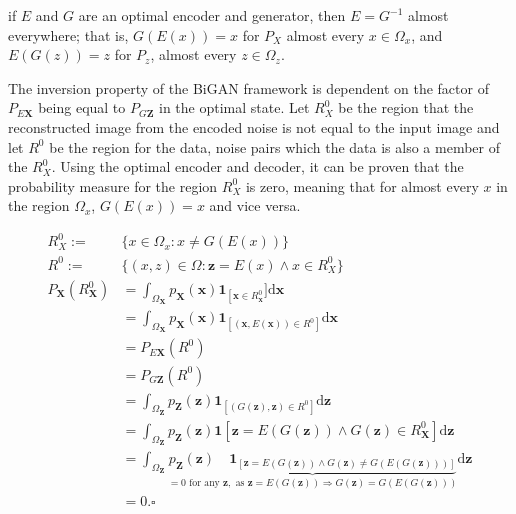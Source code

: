 \begin{theorem}
    \label{th:bigan_inv}
    if $E$ and $G$ are an optimal encoder and generator, then $E = G^{-1}$ almost everywhere; that is,
    $G(E(x)) = x$ for $P_X$ almost every $x \in \Omega_x$, and $E(G(z)) = z$ for $P_z$, almost every
    $z \in \Omega_z$. \cite{Donahue2017AdversarialFL}
\end{theorem}

The inversion property of the BiGAN framework is dependent on the factor of $P_{E\mathbf{X}}$ being
equal to $P_{G\mathbf{Z}}$ in the optimal state. Let $R_{X}^{0}$ be the region that the
reconstructed image from the encoded noise is not equal to the input image and let $R^{0}$ be the
region for the data, noise pairs which the data is also a member of the $R^{0}_{X}$. Using the
optimal encoder and decoder, it can be proven that the probability measure for the region
$R^{0}_{X}$ is zero, meaning that for almost every $x$ in the region $\Omega_x$, $G(E(x)) = x$ and
vice versa.


\begin{align}
    R^{0}_{X} :=& \{x \in \Omega_x : x \neq G(E(x))\} \\[5pt]
    R^{0} :=& \{(x,z) \in \Omega : \mathbf{z} = E(x) \land x \in R^{0}_{X}\}\\[5pt]
    P_{\mathbf{X}}\left(R_{\mathbf{X}}^{0}\right) &=\int_{\Omega_{\mathbf{X}}} p_{\mathbf{X}}(\mathbf{x}) \mathbf{1}_{\left[\mathbf{x} \in R_{\mathbf{x}}^{0}\right.} ] \mathrm{d} \mathbf{x} \\[5pt]
    &=\int_{\Omega_{\mathbf{X}}} p_{\mathbf{X}}(\mathbf{x}) \mathbf{1}_{\left[(\mathbf{x}, E(\mathbf{x})) \in R^{0}\right]} \mathrm{d} \mathbf{x} \\[5pt]
    & =P_{E \mathbf{X}}\left(R^{0}\right)\\[5pt]
    & =P_{G \mathbf{Z}}\left(R^{0}\right)\\[5pt]
    & =\int_{\Omega_{\mathbf{Z}}} p_{\mathbf{Z}}(\mathbf{z}) \mathbf{1}_{\left[(G(\mathbf{z}), \mathbf{z}) \in R^{0}\right]} \mathrm{d} \mathbf{z}\\[5pt]
    & =\int_{\Omega_{\mathbf{Z}}} p_{\mathbf{Z}}(\mathbf{z}) \mathbf{1}\left[\mathbf{z}=E(G(\mathbf{z})) \wedge G(\mathbf{z}) \in R_{\mathbf{X}}^{0}\right] \mathrm{d} \mathbf{z}\\[5pt]
    & =\int_{\Omega_{\mathbf{Z}}} \underbrace{p_{\mathbf{Z}}(\mathbf{z}) \quad \mathbf{1}_{[\mathbf{z}=E(G(\mathbf{z})) \wedge G(\mathbf{z}) \neq G(E(G(\mathbf{z})))]}}_{=0 \text { for any } \mathbf{z}, \text { as } \mathbf{z}=E(G(\mathbf{z})) \Longrightarrow G(\mathbf{z})=G(E(G(\mathbf{z})))} \mathrm{d} \mathbf{z}\\[5pt]
    &= 0. \square  \\[5pt]
\end{align}

